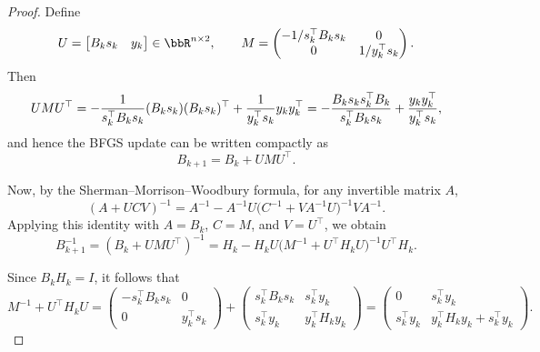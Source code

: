 \documentclass[a4paper, 10pt, dvipdfmx,draft]{article}
\begin{document}
\begin{proof}
    Define
    \begin{equation*}
        U =
        \begin{bmatrix}
            B_k s_k & y_k
        \end{bmatrix}
        \in \bbR^{n\times 2},
        \qquad
        M =
        \begin{pmatrix}
            -1/s_k^\top B_k s_k & 0              \\
            0                   & 1/y_k^\top s_k
        \end{pmatrix}.
    \end{equation*}
    Then
    \begin{equation*}
        U M U^\top
        = -\frac{1}{s_k^\top B_k s_k}(B_k s_k)(B_k s_k)^\top
        + \frac{1}{y_k^\top s_k} y_k y_k^\top \\
        = -\frac{B_k s_k s_k^\top B_k}{s_k^\top B_k s_k}
        + \frac{y_k y_k^\top}{y_k^\top s_k},
    \end{equation*}
    and hence the BFGS update can be written compactly as
    \begin{equation*}
        B_{k+1} = B_k + U M U^\top.
    \end{equation*}

    Now, by the Sherman--Morrison--Woodbury formula, for any invertible matrix $A$,
    \begin{equation*}
        (A + U C V)^{-1}
        = A^{-1} - A^{-1} U \bigl(C^{-1} + V A^{-1} U\bigr)^{-1} V A^{-1}.
    \end{equation*}
    Applying this identity with $A = B_k$, $C = M$, and $V = U^\top$, we obtain
    \begin{equation*}
        B_{k+1}^{-1}
        = (B_k + U M U^\top)^{-1}
        = H_k - H_k U \bigl(M^{-1} + U^\top H_k U\bigr)^{-1} U^\top H_k.
    \end{equation*}

    Since $B_k H_k = I$, it follows that
    \begin{equation*}
        M^{-1} + U^\top H_k U
        =
        \begin{pmatrix}
            -s_k^\top B_k s_k & 0            \\
            0                 & y_k^\top s_k
        \end{pmatrix}
        +
        \begin{pmatrix}
            s_k^\top B_k s_k & s_k^\top y_k     \\
            s_k^\top y_k     & y_k^\top H_k y_k
        \end{pmatrix}
        =
        \begin{pmatrix}
            0            & s_k^\top y_k                    \\
            s_k^\top y_k & y_k^\top H_k y_k + s_k^\top y_k
        \end{pmatrix}.
    \end{equation*}


\end{proof}
\end{document}
